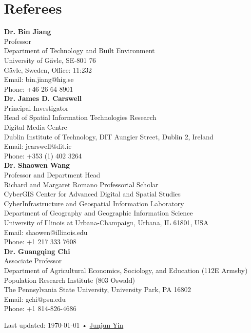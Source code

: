 \documentclass[11pt, a4paper]{article}
\begin{document}
\section*{Referees}
\noindent
\textbf{Dr. Bin Jiang}\\
Professor\\
Department of Technology and Built Environment\\
University of Gävle, SE-801 76\\
Gävle, Sweden, Office: 11:232\\
Email: bin.jiang@hig.se\\
Phone: +46 26 64 8901\\

\textbf{Dr. James D. Carswell}\\
Principal Investigator\\
Head of Spatial Information Technologies Research\\
Digital Media Centre\\
Dublin Institute of Technology, DIT Aungier Street, Dublin 2, Ireland\\
Email: jcarswell@dit.ie\\
Phone: +353 (1) 402 3264\\

\textbf{Dr. Shaowen Wang}\\
Professor and Department Head\\
Richard and Margaret Romano Professorial Scholar\\
CyberGIS Center for Advanced Digital and Spatial Studies\\
CyberInfrastructure and Geospatial Information Laboratory\\
Department of Geography and Geographic Information Science\\
University of Illinois at Urbana-Champaign, Urbana, IL 61801, USA\\
Email: shaowen@illinois.edu\\
Phone: +1 217 333 7608\\

\textbf{Dr. Guangqing Chi}\\
Associate Professor\\
Department of Agricultural Economics, Sociology, and Education (112E Armsby)\\
Population Research Institute (803 Oswald)\\
The Pennsylvania State University, University Park, PA 16802\\
Email: gchi@psu.edu\\
Phone: +1 814-826-4686
\vfill{}

\begin{center}
{\scriptsize  Last updated: \today\- •\- 
\href{https://yinjunjun.github.io}{Junjun Yin}}
\end{center}
\end{document}
